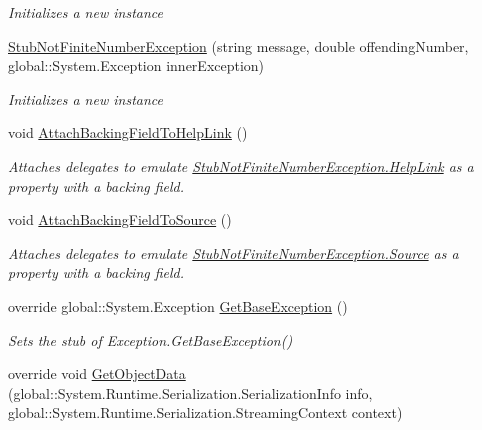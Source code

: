 \begin{DoxyCompactItemize}
\begin{DoxyCompactList}\small\item\em Initializes a new instance\end{DoxyCompactList}\item 
\hyperlink{class_system_1_1_fakes_1_1_stub_not_finite_number_exception_abe26864cc18fbdfedfc538a06b3461b1}{Stub\-Not\-Finite\-Number\-Exception} (string message, double offending\-Number, global\-::\-System.\-Exception inner\-Exception)
\begin{DoxyCompactList}\small\item\em Initializes a new instance\end{DoxyCompactList}\item 
void \hyperlink{class_system_1_1_fakes_1_1_stub_not_finite_number_exception_a4a15a2e3fdf6a24ef5e69d6884982b57}{Attach\-Backing\-Field\-To\-Help\-Link} ()
\begin{DoxyCompactList}\small\item\em Attaches delegates to emulate \hyperlink{class_system_1_1_fakes_1_1_stub_not_finite_number_exception_aa4be0b2f948724db3b6f9ad0d3010b79}{Stub\-Not\-Finite\-Number\-Exception.\-Help\-Link} as a property with a backing field.\end{DoxyCompactList}\item 
void \hyperlink{class_system_1_1_fakes_1_1_stub_not_finite_number_exception_a56c380763b8295fc9bbd1ae55a12cfcd}{Attach\-Backing\-Field\-To\-Source} ()
\begin{DoxyCompactList}\small\item\em Attaches delegates to emulate \hyperlink{class_system_1_1_fakes_1_1_stub_not_finite_number_exception_aec9453989f2e7236397b5c8459a80f0e}{Stub\-Not\-Finite\-Number\-Exception.\-Source} as a property with a backing field.\end{DoxyCompactList}\item 
override global\-::\-System.\-Exception \hyperlink{class_system_1_1_fakes_1_1_stub_not_finite_number_exception_a103262c68f3ebb4e97205607a53bbf87}{Get\-Base\-Exception} ()
\begin{DoxyCompactList}\small\item\em Sets the stub of Exception.\-Get\-Base\-Exception()\end{DoxyCompactList}\item 
override void \hyperlink{class_system_1_1_fakes_1_1_stub_not_finite_number_exception_a1c845808b81730c9dc1858a849dedce1}{Get\-Object\-Data} (global\-::\-System.\-Runtime.\-Serialization.\-Serialization\-Info info, global\-::\-System.\-Runtime.\-Serialization.\-Streaming\-Context context)

\end{DoxyCompactItemize}
